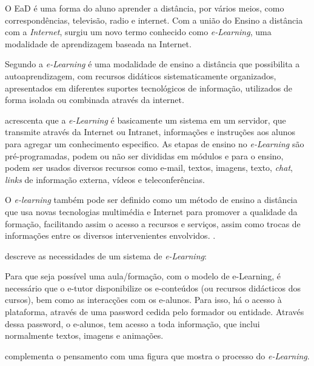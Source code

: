 O EaD é uma forma do aluno aprender a distância, por vários meios, como correspondências, televisão, radio e internet. Com a união do Ensino a distância com a \textit{Internet}, surgiu um novo termo conhecido como \textit{e-Learning}, uma modalidade de aprendizagem baseada na Internet.

Segundo  a \textit{e-Learning} é uma modalidade de ensino a distância que possibilita a autoaprendizagem, com recursos didáticos sistematicamente organizados, apresentados em diferentes suportes tecnológicos de informação, utilizados de forma isolada ou combinada através da internet.

 acrescenta que a \textit{e-Learning} é basicamente um sistema em um servidor, que transmite através da Internet ou Intranet, informações e instruções aos alunos para agregar um conhecimento especifico. As etapas de ensino no \textit{e-Learning} são pré-programadas, podem ou não ser divididas em módulos e para o ensino, podem ser usados diversos recursos como e-mail, textos, imagens, texto, \textit{chat}, \textit{links} de informação externa, vídeos e teleconferências.

O \textit{e-learning} também pode ser definido como um método de ensino a distância que usa novas tecnologias multimédia e Internet para promover a qualidade da formação, facilitando assim o acesso a recursos e serviços, assim como trocas de informações entre os diversos intervenientes envolvidos. \cite{spi}.

\cite[p.~3]{barbosa} descreve as necessidades de um sistema de \textit{e-Learning}:
\begin{citacao}
  Para que seja possível uma aula/formação, com o modelo de e-Learning, é necessário que o e-tutor disponibilize os e-conteúdos (ou recursos didácticos dos cursos), bem como as interacções com os e-alunos. Para isso, há o acesso à plataforma, através de uma password cedida pelo formador ou entidade. Através dessa password, o e-alunos, tem acesso a toda informação, que inclui normalmente textos, imagens e animações.
\end{citacao}
\cite{barbosa}
 complementa o pensamento com uma figura que mostra o processo do \textit{e-Learning}.

